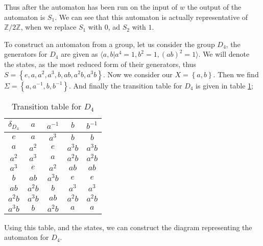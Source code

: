\documentclass[10pt]{amsart}
\theoremstyle{definition}
\theoremstyle{remark}
\newcommand{\Z}{\mathbb{Z}}
\begin{document}
Thus after the automaton has been run on the input of $w$ the output of the
automaton is $S_1$. We can see that this automaton is actually representative
of $\Z/2\Z$, when we replace $S_1$ with $0$, ad $S_2$ with $1$.

To construct an automaton from a group, let us consider the group $D_4$, the
generators for $D_4$ are given as $\langle a,b | a^4=1, b^2=1,
(ab)^2=1\rangle$. We will denote the states, as the most reduced form of their
generators, thus $S=\left\{e,a,a^2,a^3,b,ab,a^2b,a^3b\right\}$. Now we consider
our $X=\left\{a,b\right\}$. Then we find
$\Sigma=\left\{a,a^{-1},b,b^{-1}\right\}$. And finally the transition table for
$D_4$ is given in table \ref{tab:d4};

\begin{table}[htpb]
  \centering
  \caption{Transition table for $D_4$}
  \label{tab:d4}
  \begin{tabular}{c||c|c|c|c}
    $\delta_{D_4}$ & $a$ & $a^{-1}$ & $b$ & $b^{-1}$\\
    \hline\hline
    $e$ & $a$ & $a^3$ & $b$ & $b$\\
    $a$ & $a^2$ & $e$ & $a^3b$ & $a^3b$\\
    $a^2$ & $a^3$ & $a$ & $a^2b$ & $a^2b$\\
    $a^3$ & $e$ & $a^2$ & $ab$ & $ab$\\
    $b$ & $ab$ & $a^3b$ & $e$ & $e$\\
    $ab$ & $a^2b$ & $b$ & $a^3$ & $a^3$\\
    $a^2b$ & $a^3b$ & $ab$ & $a^2b$ & $a^2b$\\
    $a^3b$ & $b$ & $a^2b$ & $a$ & $a$\\
  \end{tabular}
\end{table}

Using this table, and the states, we can construct the diagram representing the
automaton for $D_4$.
\end{document}
